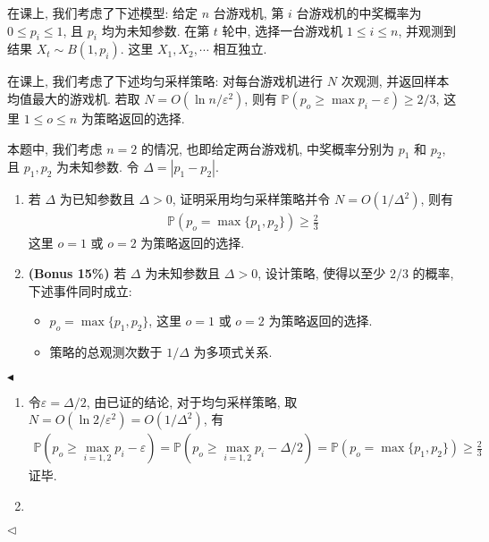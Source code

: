 \documentclass[11pt]{article}
\newenvironment{problem}[2][Problem]{\begin{trivlist}
    \item[\hskip \labelsep {\bfseries #1}\hskip \labelsep {\bfseries #2.}]\songti}{\hfill$\blacktriangleleft$\end{trivlist}}
\newenvironment{answer}[1][Solution]{\begin{trivlist}
    \item[\hskip \labelsep {\bfseries #1.}\hskip \labelsep]}{\hfill$\lhd$\end{trivlist}}
\newcommand\1{\mathds{1}}
\newcommand\PP{\mathbb{P}}
\begin{document}
\begin{problem}{5}
    在课上, 我们考虑了下述模型: 给定 $n$ 台游戏机, 第 $i$ 台游戏机的中奖概率为 $0\le p_i \le 1$, 且 $p_i$ 均为未知参数.
    在第 $t$ 轮中, 选择一台游戏机 $1\le i\le n$, 并观测到结果 $X_{t} \sim B(1, p_i)$. 这里 $X_1, X_2, \cdots $ 相互独立.

    在课上, 我们考虑了下述均匀采样策略: 对每台游戏机进行 $N$ 次观测, 并返回样本均值最大的游戏机. 
    若取 $N = O(\ln n/\varepsilon^2)$, 则有 $\PP(p_o \ge \max p_i - \varepsilon) \ge 2/3$, 
    这里 $1\le o\le n$ 为策略返回的选择.

    本题中, 我们考虑 $n=2$ 的情况, 也即给定两台游戏机, 中奖概率分别为 $p_1$ 和 $p_2$, 且 $p_1, p_2$ 为未知参数. 令 $\Delta = |p_1 - p_2|$.
    \begin{enumerate}[label=(\arabic*)]
        \item 若 $\Delta$ 为已知参数且 $\Delta > 0$, 证明采用均匀采样策略并令 $N=O(1/\Delta^2)$, 则有 
        \begin{align*}
            \PP\left(p_o = \max\{p_1, p_2\}\right) \ge \frac{2}{3}
        \end{align*}
        这里 $o=1$ 或 $o=2$ 为策略返回的选择.
        \item \textbf{(Bonus 15\%)} 若 $\Delta$ 为未知参数且 $\Delta > 0$, 设计策略, 使得以至少 $2/3$ 的概率, 下述事件同时成立:
        \begin{itemize}
            \item $p_o = \max\{p_1, p_2\}$, 这里 $o=1$ 或 $o=2$ 为策略返回的选择.
            \item 策略的总观测次数于 $1/\Delta$ 为多项式关系.
        \end{itemize}
    \end{enumerate}
\end{problem}

\begin{answer}
    \begin{enumerate}[label=(\arabic*)]
        \item 令$\varepsilon = \Delta/2$, 由已证的结论, 对于均匀采样策略, 取$N = O(\ln 2/\varepsilon^2) = O(1/\Delta^2)$, 有
        \begin{align*}
            \PP(p_o \ge \max_{i=1,2} p_i - \varepsilon) = \PP(p_o \ge \max_{i=1,2} p_i - \Delta/2) = \PP(p_o = \max \{p_1,p_2\}) \ge \frac{2}{3}
        \end{align*}
        证毕.
        \item 
    \end{enumerate}
\end{answer}
\end{document}
